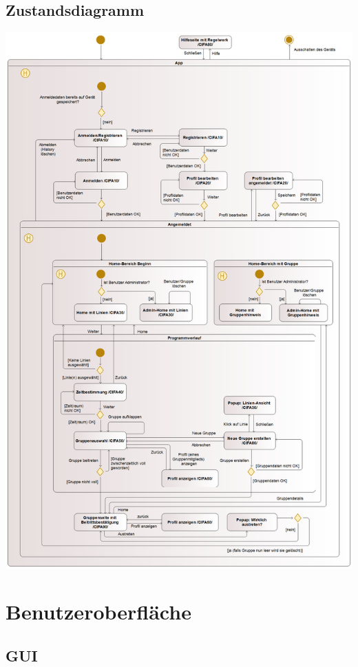 \documentclass[a4paper]{scrreprt}
\begin{document}
\section{Zustandsdiagramm}	
\begin{center}
	\includegraphics[scale=0.23]{res/Zustandsdiagramm.png}
\end{center}

\chapter{Benutzeroberfläche}
\section{GUI}
\end{document}

